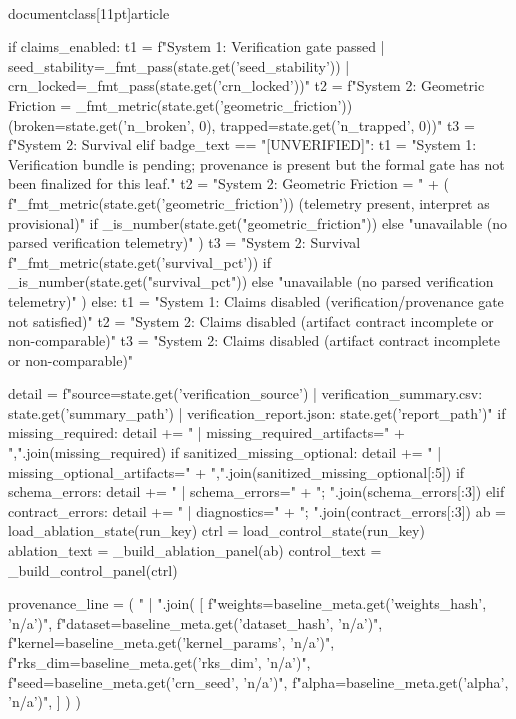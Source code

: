 \\documentclass[11pt]{article}
\begin{document}
\begin{CodeBlock}
{{{{{{{{    if claims_enabled:
        t1 = f"System 1: Verification gate passed | seed_stability={_fmt_pass(state.get('seed_stability'))} | crn_locked={_fmt_pass(state.get('crn_locked'))}"
        t2 = f"System 2: Geometric Friction = {_fmt_metric(state.get('geometric_friction'))} (broken={state.get('n_broken', 0)}, trapped={state.get('n_trapped', 0)})"
        t3 = f"System 2: Survival %
    elif badge_text == "[UNVERIFIED]":
        t1 = "System 1: Verification bundle is pending; provenance is present but the formal gate has not been finalized for this leaf."
        t2 = "System 2: Geometric Friction = " + (
            f"{_fmt_metric(state.get('geometric_friction'))} (telemetry present, interpret as provisional)"
            if _is_number(state.get("geometric_friction"))
            else "unavailable (no parsed verification telemetry)"
        )
        t3 = "System 2: Survival %
            f"{_fmt_metric(state.get('survival_pct'))}%
            if _is_number(state.get("survival_pct"))
            else "unavailable (no parsed verification telemetry)"
        )
    else:
        t1 = "System 1: Claims disabled (verification/provenance gate not satisfied)"
        t2 = "System 2: Claims disabled (artifact contract incomplete or non-comparable)"
        t3 = "System 2: Claims disabled (artifact contract incomplete or non-comparable)"

    detail = f"source={state.get('verification_source')} | verification_summary.csv: {state.get('summary_path')} | verification_report.json: {state.get('report_path')}"
    if missing_required:
        detail += " | missing_required_artifacts=" + ",".join(missing_required)
    if sanitized_missing_optional:
        detail += " | missing_optional_artifacts=" + ",".join(sanitized_missing_optional[:5])
    if schema_errors:
        detail += " | schema_errors=" + "; ".join(schema_errors[:3])
    elif contract_errors:
        detail += " | diagnostics=" + "; ".join(contract_errors[:3])
    ab = load_ablation_state(run_key)
    ctrl = load_control_state(run_key)
    ablation_text = _build_ablation_panel(ab)
    control_text = _build_control_panel(ctrl)

    provenance_line = (
        " | ".join(
            [
                f"weights={baseline_meta.get('weights_hash', 'n/a')}",
                f"dataset={baseline_meta.get('dataset_hash', 'n/a')}",
                f"kernel={baseline_meta.get('kernel_params', 'n/a')}",
                f"rks_dim={baseline_meta.get('rks_dim', 'n/a')}",
                f"seed={baseline_meta.get('crn_seed', 'n/a')}",
                f"alpha={baseline_meta.get('alpha', 'n/a')}",
            ]
        )
    )

}}}}}}}}
\end{CodeBlock}
\end{document}

